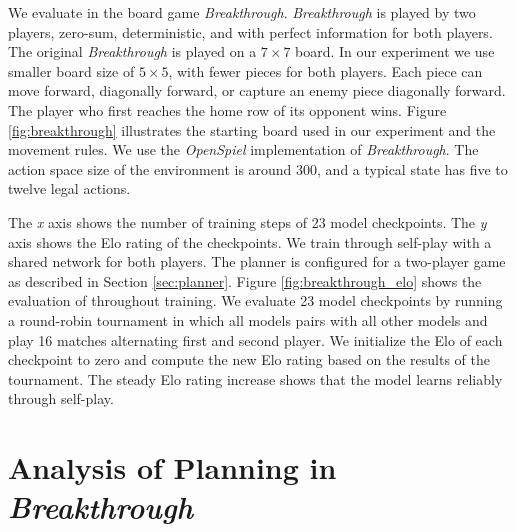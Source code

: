 
We evaluate \moozi in the board game \textit{Breakthrough}.
\textit{Breakthrough} is played by two players, zero-sum, deterministic, and with perfect information for both players.
The original \textit{Breakthrough} is played on a $7 \times 7$ board.
In our experiment we use smaller board size of \(5 \times 5\), with fewer pieces for both players.
Each piece can move forward, diagonally forward, or capture an enemy piece diagonally forward.
The player who first reaches the home row of its opponent wins.
Figure \ref{fig:breakthrough} illustrates the starting board used in our experiment and the movement rules.
We use the \textit{OpenSpiel} implementation of \textit{Breakthrough}.
The action space size of the environment is around 300, and a typical state has five to twelve legal actions.

{
    The \textit{x} axis shows the number of training steps of 23 model checkpoints.
    The \textit{y} axis shows the Elo rating of the checkpoints.
}
We train \moozi through self-play with a shared network for both players.
The planner is configured for a two-player game as described in Section \ref{sec:planner}.
Figure \ref{fig:breakthrough_elo} shows the evaluation of \moozi throughout training.
We evaluate 23 model checkpoints by running a round-robin tournament in which all models pairs with all other models and play 16 matches alternating first and second player.
We initialize the Elo of each checkpoint to zero and compute the new Elo rating based on the results of the tournament.
The steady Elo rating increase shows that the model learns reliably through self-play.


\section{Analysis of Planning in \textit{Breakthrough}} \label{sec:exp:plan_breakthrough}

